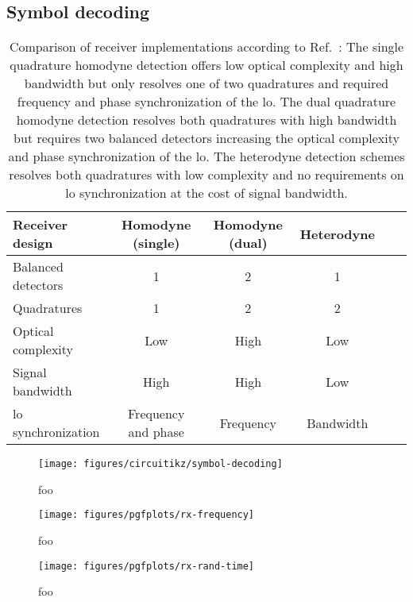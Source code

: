 \FloatBarrier
\subsection{Symbol decoding}

\begin{table}[htb]
  \centering
  \begin{tabular}{lccccc}
    \toprule
    Receiver design & Homodyne (single) & Homodyne (dual) & Heterodyne \\
    \midrule
    Balanced detectors & \num{1} & \num{2} & \num{1} \\
    Quadratures & \num{1} & \num{2} & \num{2} \\
    Optical complexity & Low & High & Low \\
    Signal bandwidth & High & High & Low \\
    \gls{lo} synchronization & Frequency and phase & Frequency & Bandwidth \\
    \bottomrule
  \end{tabular}
  \caption{Comparison of receiver implementations according to Ref.~\cite{Brunner2017}: The single quadrature homodyne detection offers low optical complexity and high bandwidth but only resolves one of two quadratures and required frequency and phase synchronization of the \gls{lo}. The dual quadrature homodyne detection resolves both quadratures with high bandwidth but requires two balanced detectors increasing the optical complexity and phase synchronization of the \gls{lo}. The heterodyne detection schemes resolves both quadratures with low complexity and no requirements on \gls{lo} synchronization at the cost of signal bandwidth.}\label{tab:receivers}
\end{table}

\begin{figure}[htb]
	\centering
	\texttt{[image: figures/circuitikz/symbol-decoding]}
	\caption{foo}
\end{figure}

\begin{figure}[htb]
	\centering
	\texttt{[image: figures/pgfplots/rx-frequency]}
	\caption{foo}
\end{figure}

\begin{figure}[htb]
	\centering
	\texttt{[image: figures/pgfplots/rx-rand-time]}
	\caption{foo}
\end{figure}